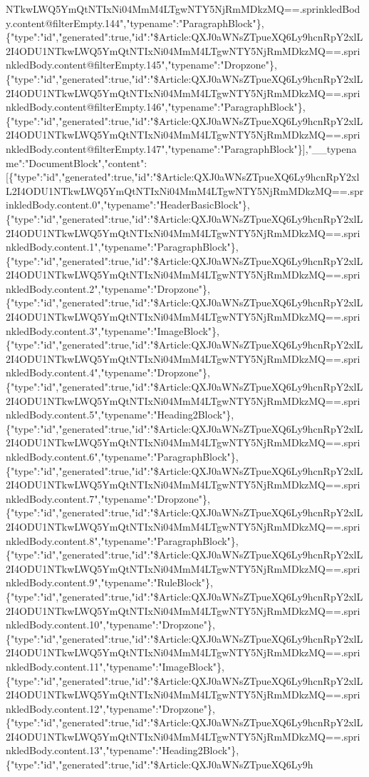 NTkwLWQ5YmQtNTIxNi04MmM4LTgwNTY5NjRmMDkzMQ==.sprinkledBody.content@filterEmpty.144","typename":"ParagraphBlock"\},\{"type":"id","generated":true,"id":"\$Article:QXJ0aWNsZTpueXQ6Ly9hcnRpY2xlL2I4ODU1NTkwLWQ5YmQtNTIxNi04MmM4LTgwNTY5NjRmMDkzMQ==.sprinkledBody.content@filterEmpty.145","typename":"Dropzone"\},\{"type":"id","generated":true,"id":"\$Article:QXJ0aWNsZTpueXQ6Ly9hcnRpY2xlL2I4ODU1NTkwLWQ5YmQtNTIxNi04MmM4LTgwNTY5NjRmMDkzMQ==.sprinkledBody.content@filterEmpty.146","typename":"ParagraphBlock"\},\{"type":"id","generated":true,"id":"\$Article:QXJ0aWNsZTpueXQ6Ly9hcnRpY2xlL2I4ODU1NTkwLWQ5YmQtNTIxNi04MmM4LTgwNTY5NjRmMDkzMQ==.sprinkledBody.content@filterEmpty.147","typename":"ParagraphBlock"\}{]},"\_\_typename":"DocumentBlock","content":{[}\{"type":"id","generated":true,"id":"\$Article:QXJ0aWNsZTpueXQ6Ly9hcnRpY2xlL2I4ODU1NTkwLWQ5YmQtNTIxNi04MmM4LTgwNTY5NjRmMDkzMQ==.sprinkledBody.content.0","typename":"HeaderBasicBlock"\},\{"type":"id","generated":true,"id":"\$Article:QXJ0aWNsZTpueXQ6Ly9hcnRpY2xlL2I4ODU1NTkwLWQ5YmQtNTIxNi04MmM4LTgwNTY5NjRmMDkzMQ==.sprinkledBody.content.1","typename":"ParagraphBlock"\},\{"type":"id","generated":true,"id":"\$Article:QXJ0aWNsZTpueXQ6Ly9hcnRpY2xlL2I4ODU1NTkwLWQ5YmQtNTIxNi04MmM4LTgwNTY5NjRmMDkzMQ==.sprinkledBody.content.2","typename":"Dropzone"\},\{"type":"id","generated":true,"id":"\$Article:QXJ0aWNsZTpueXQ6Ly9hcnRpY2xlL2I4ODU1NTkwLWQ5YmQtNTIxNi04MmM4LTgwNTY5NjRmMDkzMQ==.sprinkledBody.content.3","typename":"ImageBlock"\},\{"type":"id","generated":true,"id":"\$Article:QXJ0aWNsZTpueXQ6Ly9hcnRpY2xlL2I4ODU1NTkwLWQ5YmQtNTIxNi04MmM4LTgwNTY5NjRmMDkzMQ==.sprinkledBody.content.4","typename":"Dropzone"\},\{"type":"id","generated":true,"id":"\$Article:QXJ0aWNsZTpueXQ6Ly9hcnRpY2xlL2I4ODU1NTkwLWQ5YmQtNTIxNi04MmM4LTgwNTY5NjRmMDkzMQ==.sprinkledBody.content.5","typename":"Heading2Block"\},\{"type":"id","generated":true,"id":"\$Article:QXJ0aWNsZTpueXQ6Ly9hcnRpY2xlL2I4ODU1NTkwLWQ5YmQtNTIxNi04MmM4LTgwNTY5NjRmMDkzMQ==.sprinkledBody.content.6","typename":"ParagraphBlock"\},\{"type":"id","generated":true,"id":"\$Article:QXJ0aWNsZTpueXQ6Ly9hcnRpY2xlL2I4ODU1NTkwLWQ5YmQtNTIxNi04MmM4LTgwNTY5NjRmMDkzMQ==.sprinkledBody.content.7","typename":"Dropzone"\},\{"type":"id","generated":true,"id":"\$Article:QXJ0aWNsZTpueXQ6Ly9hcnRpY2xlL2I4ODU1NTkwLWQ5YmQtNTIxNi04MmM4LTgwNTY5NjRmMDkzMQ==.sprinkledBody.content.8","typename":"ParagraphBlock"\},\{"type":"id","generated":true,"id":"\$Article:QXJ0aWNsZTpueXQ6Ly9hcnRpY2xlL2I4ODU1NTkwLWQ5YmQtNTIxNi04MmM4LTgwNTY5NjRmMDkzMQ==.sprinkledBody.content.9","typename":"RuleBlock"\},\{"type":"id","generated":true,"id":"\$Article:QXJ0aWNsZTpueXQ6Ly9hcnRpY2xlL2I4ODU1NTkwLWQ5YmQtNTIxNi04MmM4LTgwNTY5NjRmMDkzMQ==.sprinkledBody.content.10","typename":"Dropzone"\},\{"type":"id","generated":true,"id":"\$Article:QXJ0aWNsZTpueXQ6Ly9hcnRpY2xlL2I4ODU1NTkwLWQ5YmQtNTIxNi04MmM4LTgwNTY5NjRmMDkzMQ==.sprinkledBody.content.11","typename":"ImageBlock"\},\{"type":"id","generated":true,"id":"\$Article:QXJ0aWNsZTpueXQ6Ly9hcnRpY2xlL2I4ODU1NTkwLWQ5YmQtNTIxNi04MmM4LTgwNTY5NjRmMDkzMQ==.sprinkledBody.content.12","typename":"Dropzone"\},\{"type":"id","generated":true,"id":"\$Article:QXJ0aWNsZTpueXQ6Ly9hcnRpY2xlL2I4ODU1NTkwLWQ5YmQtNTIxNi04MmM4LTgwNTY5NjRmMDkzMQ==.sprinkledBody.content.13","typename":"Heading2Block"\},\{"type":"id","generated":true,"id":"\$Article:QXJ0aWNsZTpueXQ6Ly9h
